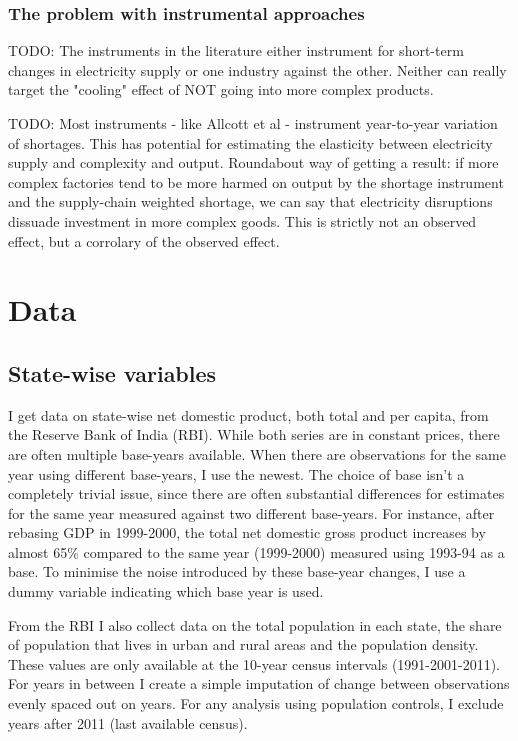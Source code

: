 \documentclass[11pt]{article}
\begin{document}
\subsubsection{The problem with instrumental approaches}
\label{sec:orge917ac0}

TODO: The instruments in the literature either instrument for short-term changes in electricity supply or one industry against the other. Neither can really target the "cooling" effect of NOT going into more complex products.

TODO: Most instruments - like Allcott et al - instrument year-to-year variation of shortages. This has potential for estimating the elasticity between electricity supply and complexity and output. Roundabout way of getting a result: if more complex factories tend to be more harmed on output by the shortage instrument and the supply-chain weighted shortage, we can say that electricity disruptions dissuade investment in more complex goods. This is strictly not an observed effect, but a corrolary of the observed effect.

\section{Data}%
\label{sub:data}

\subsection{State-wise variables}%
\label{sub:state_wise_variables}

I get data on state-wise net domestic product, both total and per capita, from the Reserve Bank of India (RBI). While both series are in constant prices, there are often multiple base-years available. When there are observations for the same year using different base-years, I use the newest. The choice of base isn't a completely trivial issue, since there are often substantial differences for estimates for the same year measured against two different base-years. For instance, after rebasing GDP in 1999-2000, the total net domestic gross product increases by almost 65\% compared to the same year (1999-2000) measured using 1993-94 as a base. To minimise the noise introduced by these base-year changes, I use a dummy variable indicating which base year is used.

From the RBI I also collect data on the total population in each state, the share of population that lives in urban and rural areas and the population density. These values are only available at the 10-year census intervals (1991-2001-2011). For years in between I create a simple imputation of change between observations evenly spaced out on years. For any analysis using population controls, I exclude years after 2011 (last available census).
\end{document}
